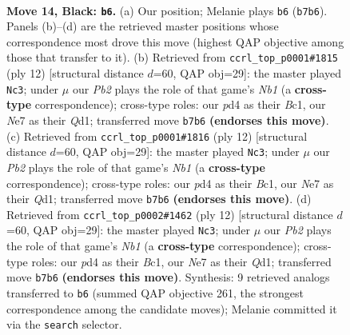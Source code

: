 \documentclass[11pt]{article}
\begin{document}
\clearpage

\begin{figure}[p]\centering
\begin{subfigure}{0.46\textwidth}\centering
\resizebox{\linewidth}{!}{%
\newchessgame
\chessboard[
  setfen={2b1qrk1/rppnnppp/4p3/p2pP3/3P1P2/2N5/PPP2KPP/R2Q1BNR b - - 1 14},
  showmover=false,
  pgfstyle=straightmove, color=movearrow, markmove={b7-b6}
]}
\caption{}
\end{subfigure}\hfill
\begin{subfigure}{0.46\textwidth}\centering
\resizebox{\linewidth}{!}{%
\newchessgame
\chessboard[
  setfen={r1bqkb1r/1pp2ppp/p1n1pn2/8/2pP4/5NP1/PP2PPBP/RNBQ1RK1 w kq - 2 7},
  showmover=false,
  pgfstyle=straightmove, color=movearrow, markmove={b1-c3}
]}
\caption{}
\end{subfigure}
\\[4pt]
\begin{subfigure}{0.46\textwidth}\centering
\resizebox{\linewidth}{!}{%
\newchessgame
\chessboard[
  setfen={r1bqkb1r/1pp2ppp/p1n1pn2/8/2pP4/5NP1/PP2PPBP/RNBQ1RK1 w kq - 2 7},
  showmover=false,
  pgfstyle=straightmove, color=movearrow, markmove={b1-c3}
]}
\caption{}
\end{subfigure}\hfill
\begin{subfigure}{0.46\textwidth}\centering
\resizebox{\linewidth}{!}{%
\newchessgame
\chessboard[
  setfen={r1bqkb1r/1pp2ppp/p1n1pn2/8/2pP4/5NP1/PP2PPBP/RNBQ1RK1 w kq - 2 7},
  showmover=false,
  pgfstyle=straightmove, color=movearrow, markmove={b1-c3}
]}
\caption{}
\end{subfigure}
\caption{\textbf{Move 14, Black: \texttt{b6}.} (a) Our position; Melanie plays \texttt{b6} (\texttt{b7b6}). Panels (b)--(d) are the retrieved master positions whose correspondence most drove this move (highest QAP objective among those that transfer to it). (b) Retrieved from \texttt{ccrl\_top\_p0001\#1815} (ply 12) [structural distance $d$=60, QAP obj=29]: the master played \texttt{Nc3}; under $\mu$ our \emph{Pb2} plays the role of that game's \emph{Nb1} (a \textbf{cross-type} correspondence); cross-type roles: our \emph{p}d4 as their \emph{B}c1, our \emph{N}e7 as their \emph{Q}d1; transferred move \texttt{b7b6} \textbf{(endorses this move)}. (c) Retrieved from \texttt{ccrl\_top\_p0001\#1816} (ply 12) [structural distance $d$=60, QAP obj=29]: the master played \texttt{Nc3}; under $\mu$ our \emph{Pb2} plays the role of that game's \emph{Nb1} (a \textbf{cross-type} correspondence); cross-type roles: our \emph{p}d4 as their \emph{B}c1, our \emph{N}e7 as their \emph{Q}d1; transferred move \texttt{b7b6} \textbf{(endorses this move)}. (d) Retrieved from \texttt{ccrl\_top\_p0002\#1462} (ply 12) [structural distance $d$=60, QAP obj=29]: the master played \texttt{Nc3}; under $\mu$ our \emph{Pb2} plays the role of that game's \emph{Nb1} (a \textbf{cross-type} correspondence); cross-type roles: our \emph{p}d4 as their \emph{B}c1, our \emph{N}e7 as their \emph{Q}d1; transferred move \texttt{b7b6} \textbf{(endorses this move)}. Synthesis: 9 retrieved analogs transferred to \texttt{b6} (summed QAP objective 261, the strongest correspondence among the candidate moves); Melanie committed it via the \texttt{search} selector.}
\label{fig:thought-m27}
\end{figure}
\end{document}
